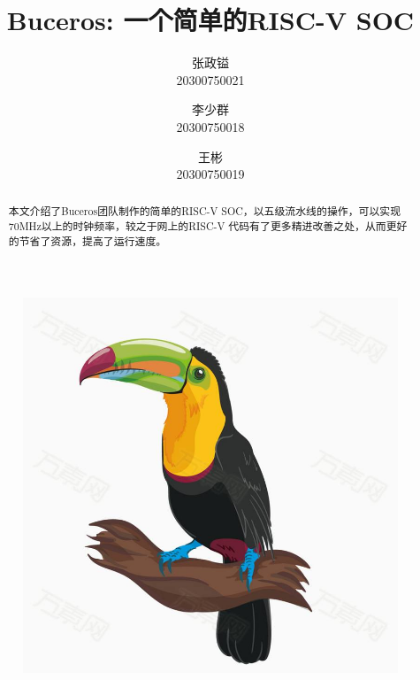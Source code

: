 \documentclass[lang=cn,11pt,a4paper]{elegantpaper}
\title{Buceros: 一个简单的RISC-V SOC}
\author{张政镒 \\ 20300750021 \and 李少群 \\ 20300750018 \and 王彬 \\ 20300750019}
\institute{\href{https://github.com/0xtaruhi/Buceros}{Github项目链接}}
\date{\zhtoday}
\begin{document}
\maketitle
\begin{figure}[h]
	\centering			
	\includegraphics[scale=0.1]{buceros}
\end{figure} 
\begin{abstract}
    本文介绍了Buceros团队制作的简单的RISC-V SOC，以五级流水线的操作，可以实现70MHz以上的时钟频率，较之于网上的RISC-V 代码有了更多精进改善之处，从而更好的节省了资源，提高了运行速度。
\end{abstract}
		
\end{document}
